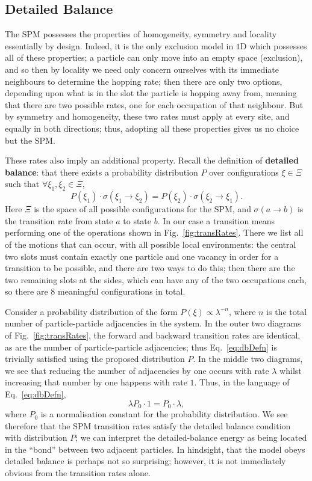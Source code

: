 \subsection{Detailed Balance} \label{sec:dbProof}
The SPM possesses the properties of homogeneity, symmetry and locality essentially by design. Indeed, it is
the only exclusion model in $1$D which possesses all of these properties; a particle can only move into
an empty space (exclusion), and so then by locality we need only concern ourselves with its immediate 
neighbours to determine the hopping rate; then there are only two options, depending upon what is in the 
slot the particle is hopping away from, meaning that there are two possible rates, one for each occupation
of that neighbour. But by symmetry and homogeneity, these two rates must apply at every site, and equally
in both directions; thus, adopting all these properties gives us no choice but the SPM.

These rates also imply an additional property. Recall the definition of \textbf{detailed balance}:
that there exists
a probability distribution $P$ over configurations $\xi \in \Xi$ such that 
$\forall \xi_1 , \xi_2 \in \Xi $,
  \begin{equation} \label{eq:dbDefn}
    P(\xi_1) \cdot \sigma(\xi_1 \rightarrow \xi_2) = P(\xi_2) \cdot \sigma(\xi_2 \rightarrow \xi_1).
  \end{equation}  
Here $\Xi$ is the space of all possible configurations for the SPM, and 
$\sigma(a \rightarrow b)$ is the transition rate from state $a$ to state $b$. In our case a transition
means performing one of the operations shown in Fig.~\ref{fig:transRates}. There we
list all of the motions that can occur, with all possible local environments: the central two slots must
contain exactly one particle and one vacancy in order for a transition to be possible, and there are two
ways to do this; then there are the two remaining slots at the sides, which can have any of the two
occupations each, so there are $8$ meaningful configurations in total.

Consider a probability distribution of the form $P(\xi) \propto \lambda^{-n}$, where $n$ is the total
number of particle-particle adjacencies in the system. In the outer two diagrams of 
Fig.~\ref{fig:transRates}, the forward and backward transition rates are identical, as are the number of
particle-particle adjacencies; thus Eq.~\ref{eq:dbDefn} is trivially satisfied using the proposed 
distribution $P$. In the middle two diagrams, we see that reducing the number of adjacencies by one
occurs with rate $\lambda$ whilst increasing that number by one happens with rate $1$. Thus, in the 
language of Eq.~\ref{eq:dbDefn},
\begin{equation}
 \lambda P_0 \cdot 1 = P_0 \cdot \lambda,
\end{equation}
where $P_0$ is a normalisation constant for the probability distribution. We see therefore that the SPM
transition rates satisfy the detailed balance condition with distribution $P$; we can interpret the 
detailed-balance energy as being located in the ``bond'' between two adjacent particles. In hindsight,
that the model obeys detailed balance is perhaps not so surprising; however, it is not immediately 
obvious from the transition rates alone.

